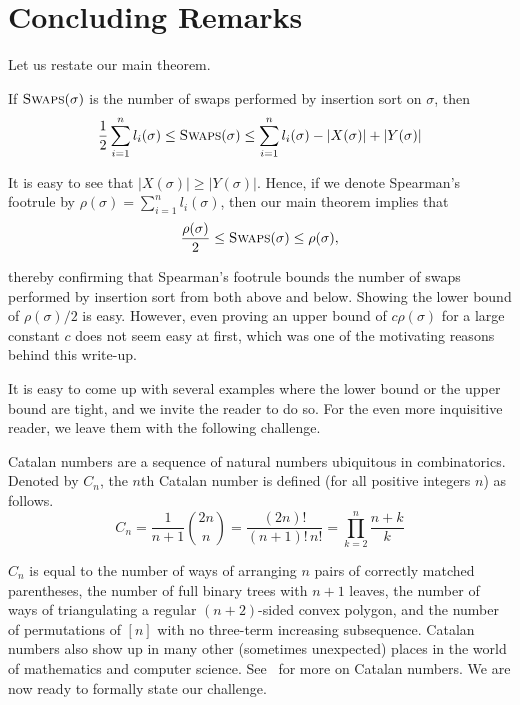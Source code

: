 \documentclass[12pt]{article}
\begin{document}
    \section{Concluding Remarks}
    
    Let us restate our main theorem.
    
    \begin{Theorem}
    If $\textsc{Swaps}(\sigma)$ is the number of swaps performed by insertion sort on $\sigma$, then
    $$\displaystyle{\frac{1}{2}\sum_{i=1}^n l_i(\sigma) \leq \textsc{Swaps}(\sigma) \leq \sum_{i=1}^n l_i(\sigma) - |X(\sigma)| + |Y(\sigma)|}$$
    \end{Theorem}
    
    It is easy to see that $|X(\sigma)|\geq |Y(\sigma)|$. Hence, if we denote Spearman's footrule by $\rho(\sigma)=\sum_{i=1}^n l_i(\sigma)$, then our main theorem implies that $$\frac{\rho(\sigma)}{2} \leq \textsc{Swaps}(\sigma) \leq \rho(\sigma),$$
    
    thereby confirming that Spearman's footrule bounds the number of swaps performed by insertion sort from both above and below. Showing the lower bound of $\rho(\sigma)/2$ is easy. However, even proving an upper bound of $c\rho(\sigma)$ for a large constant $c$ does not seem easy at first, which was one of the motivating reasons behind this write-up.
    
    It is easy to come up with several examples where the lower bound or the upper bound are tight, and we invite the reader to do so. For the even more inquisitive reader, we leave them with the following challenge.
    
    Catalan numbers are a sequence of natural numbers ubiquitous in combinatorics. Denoted by $C_n$, the $n$th Catalan number is defined (for all positive integers $n$) as follows. $$C_n = \frac{1}{n+1}\binom{2n}{n} = \frac{(2n)!}{(n+1)!\,n!} = \prod\limits_{k=2}^{n}\frac{n+k}{k}$$
    
    $C_n$ is equal to the number of ways of arranging $n$ pairs of correctly matched parentheses, the number of full binary trees with $n + 1$ leaves, the number of ways of triangulating a regular $(n + 2)$-sided convex polygon, and the number of permutations of $[n]$ with no three-term increasing subsequence. Catalan numbers also show up in many other (sometimes unexpected) places in the world of mathematics and computer science. See~\cite{koshy2008catalan,stanley2015catalan,enwiki:bcatalannumbers} for more on Catalan numbers. We are now ready to formally state our challenge.
    
\end{document}
